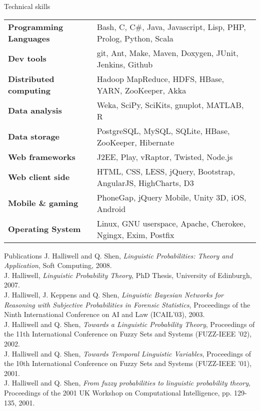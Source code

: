 \documentclass{resume} %
\begin{document}

\begin{rSection}{Technical skills}

\begin{tabular}{ @{} >{\bfseries}l @{\hspace{6ex}} l }
Programming Languages & Bash, C, C\#, Java, Javascript, Lisp, PHP, Prolog, Python, Scala \\
Dev tools & git, Ant, Make, Maven, Doxygen, JUnit, Jenkins, Github \\
Distributed computing & Hadoop MapReduce, HDFS, HBase, YARN, ZooKeeper, Akka \\
Data analysis & Weka, SciPy, SciKits, gnuplot, MATLAB, R \\
Data storage & PostgreSQL, MySQL, SQLite, HBase, ZooKeeper, Hibernate \\
Web frameworks & J2EE, Play, vRaptor, Twisted, Node.js \\
Web client side & HTML, CSS, LESS, jQuery, Bootstrap, AngularJS, HighCharts, D3 \\
Mobile \& gaming & PhoneGap, jQuery Mobile, Unity 3D, iOS, Android \\
Operating System & Linux, GNU userspace, Apache, Cherokee, Ngingx, Exim, Postfix \\
\end{tabular}

\end{rSection}


\begin{rSection}{Publications}
J. Halliwell and Q. Shen, {\em Linguistic Probabilities: Theory and Application}, Soft Computing, 2008.\\
J. Halliwell, {\em Linguistic Probability Theory}, PhD Thesis, University of Edinburgh, 2007.\\
J. Halliwell, J. Keppens and Q. Shen, {\em Linguistic Bayesian Networks for Reasoning with
Subjective Probabilities in Forensic Statistics}, Proceedings of the Ninth International
Conference on AI and Law (ICAIL'03), 2003.\\
J. Halliwell and Q. Shen, {\em Towards a Linguistic Probability Theory}, Proceedings of the
11th International Conference on Fuzzy Sets and Systems (FUZZ-IEEE '02), 2002.\\
J. Halliwell and Q. Shen, {\em Towards Temporal Linguistic Variables}, Proceedings of the
10th International Conference on Fuzzy Sets and Systems (FUZZ-IEEE '01), 2001.\\
J. Halliwell and Q. Shen, {\em From fuzzy probabilities to linguistic probability theory},
Proceedings of the 2001 UK Workshop on Computational Intelligence, pp. 129-135,
2001.\\
\end{rSection}
\end{document}
